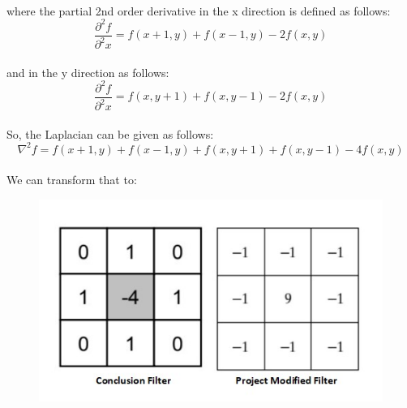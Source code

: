 \paragraph{}
where the partial 2nd order derivative in the x direction is defined as follows:\newline
\[\frac{\partial^{2}f}{\partial^{2}x} = f(x+1, y) + f(x-1, y) - 2f(x, y)\]

\paragraph{}
and in the y direction as follows:\newline
\[\frac{\partial^{2}f}{\partial^{2}x} = f(x, y+1) + f(x, y-1) - 2f(x, y)\]

\paragraph{}
So, the Laplacian can be given as follows:\newline
\[\nabla^{2} f = f(x+1, y) + f(x-1, y) + f(x, y+1) + f(x, y-1) - 4f(x, y)\]

\paragraph{}
We can transform that to:\newline
\begin{figure}[H]
	\centering
	\includegraphics[width=\linewidth]{images/filters.jpg}
\end{figure}

